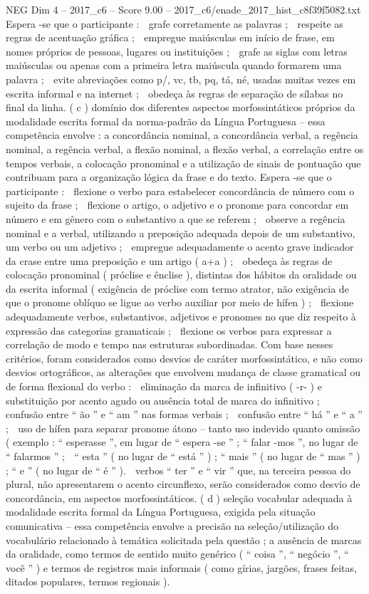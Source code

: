 \begin{textsample}{NEG Dim 4 – 2017\_c6 – Score 9.00 – 2017\_c6/enade\_2017\_hist\_c8f39f5082.txt}
Espera -se que o participante :  grafe corretamente as palavras ;  respeite as regras de acentuação gráfica ;  empregue maiúsculas em início de frase, em nomes próprios de pessoas, lugares ou instituições ;  grafe as siglas com letras maiúsculas ou apenas com a primeira letra maiúscula quando formarem uma palavra ;  evite abreviações como p/, vc, tb, pq, tá, né, usadas muitas vezes em escrita informal e na internet ;  obedeça às regras de separação de sílabas no final da linha. ( c ) domínio dos diferentes aspectos morfossintáticos próprios da modalidade escrita formal da norma-padrão da Língua Portuguesa – essa competência envolve : a concordância nominal, a concordância verbal, a regência nominal, a regência verbal, a flexão nominal, a flexão verbal, a correlação entre os tempos verbais, a colocação pronominal e a utilização de sinais de pontuação que contribuam para a organização lógica da frase e do texto.
Espera -se que o participante :  flexione o verbo para estabelecer concordância de número com o sujeito da frase ;  flexione o artigo, o adjetivo e o pronome para concordar em número e em gênero com o substantivo a que se referem ;  observe a regência nominal e a verbal, utilizando a preposição adequada depois de um substantivo, um verbo ou um adjetivo ;  empregue adequadamente o acento grave indicador da crase entre uma preposição e um artigo ( a+a ) ;  obedeça às regras de colocação pronominal ( próclise e ênclise ), distintas dos hábitos da oralidade ou da escrita informal ( exigência de próclise com termo atrator, não exigência de que o pronome oblíquo se ligue ao verbo auxiliar por meio de hífen ) ;  flexione adequadamente verbos, substantivos, adjetivos e pronomes no que diz respeito à expressão das categorias gramaticais ;  flexione os verbos para expressar a correlação de modo e tempo nas estruturas subordinadas.
Com base nesses critérios, foram considerados como desvios de caráter morfossintático, e não como desvios ortográficos, as alterações que envolvem mudança de classe gramatical ou de forma flexional do verbo :  eliminação da marca de infinitivo ( -r- ) e substituição por acento agudo ou ausência total de marca do infinitivo ;  confusão entre “ ão ” e “ am ” nas formas verbais ;  confusão entre “ há ” e “ a ” ;  uso de hífen para separar pronome átono – tanto uso indevido quanto omissão ( exemplo : “ esperasse ”, em lugar de “ espera -se ” ; “ falar -mos ”, no lugar de “ falarmos ” ;  “ esta ” ( no lugar de “ está ” ) ; “ mais ” ( no lugar de “ mas ” ) ; “ e ” ( no lugar de “ é ” ).  verbos “ ter ” e “ vir ” que, na terceira pessoa do plural, não apresentarem o acento circunflexo, serão considerados como desvio de concordância, em aspectos morfossintáticos. ( d ) seleção vocabular adequada à modalidade escrita formal da Língua Portuguesa, exigida pela situação comunicativa – essa competência envolve a precisão na seleção/utilização do vocabulário relacionado à temática solicitada pela questão ; a ausência de marcas da oralidade, como termos de sentido muito genérico ( “ coisa ”, “ negócio ”, “ você ” ) e termos de registros mais informais ( como gírias, jargões, frases feitas, ditados populares, termos regionais ).

\end{textsample}
